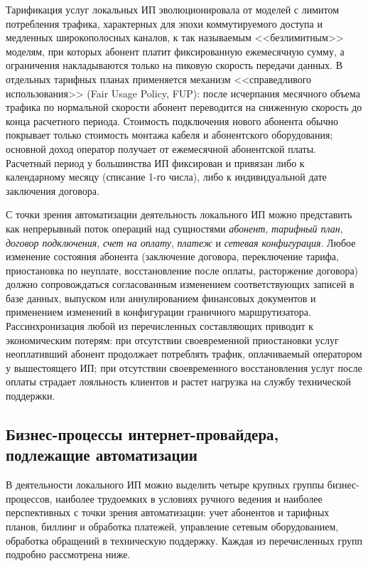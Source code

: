 Тарификация услуг локальных ИП эволюционировала от моделей с лимитом потребления трафика, характерных для эпохи коммутируемого доступа и медленных широкополосных каналов, к так называемым <<безлимитным>> моделям, при которых абонент платит фиксированную ежемесячную сумму, а ограничения накладываются только на пиковую скорость передачи данных. В отдельных тарифных планах применяется механизм <<справедливого использования>> (Fair Usage Policy, FUP): после исчерпания месячного объема трафика по нормальной скорости абонент переводится на сниженную скорость до конца расчетного периода. Стоимость подключения нового абонента обычно покрывает только стоимость монтажа кабеля и абонентского оборудования; основной доход оператор получает от ежемесячной абонентской платы. Расчетный период у большинства ИП фиксирован и привязан либо к календарному месяцу (списание 1-го числа), либо к индивидуальной дате заключения договора.

С точки зрения автоматизации деятельность локального ИП можно представить как непрерывный поток операций над сущностями \emph{абонент}, \emph{тарифный план}, \emph{договор подключения}, \emph{счет на оплату}, \emph{платеж} и \emph{сетевая конфигурация}. Любое изменение состояния абонента (заключение договора, переключение тарифа, приостановка по неуплате, восстановление после оплаты, расторжение договора) должно сопровождаться согласованным изменением соответствующих записей в базе данных, выпуском или аннулированием финансовых документов и применением изменений в конфигурации граничного маршрутизатора. Рассинхронизация любой из перечисленных составляющих приводит к экономическим потерям: при отсутствии своевременной приостановки услуг неоплативший абонент продолжает потреблять трафик, оплачиваемый оператором у вышестоящего ИП; при отсутствии своевременного восстановления услуг после оплаты страдает лояльность клиентов и растет нагрузка на службу технической поддержки.

\subsection{Бизнес-процессы интернет-провайдера, подлежащие автоматизации}

В деятельности локального ИП можно выделить четыре крупных группы бизнес-процессов, наиболее трудоемких в условиях ручного ведения и наиболее перспективных с точки зрения автоматизации: учет абонентов и тарифных планов, биллинг и обработка платежей, управление сетевым оборудованием, обработка обращений в техническую поддержку. Каждая из перечисленных групп подробно рассмотрена ниже.

